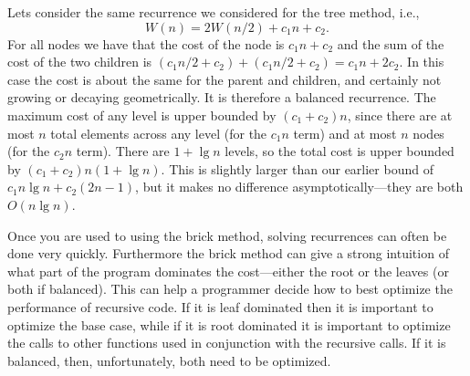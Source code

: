 \begin{cluster}
\label{grp:xmpl:analysis::recurrences::balanced}

\begin{example}[Balanced]
\label{xmpl:analysis::recurrences::balanced}
Lets consider the same recurrence we considered for the tree method, i.e.,
\[W(n) = 2 W(n/2) + c_1 n + c_2.\]
For all nodes we have that the cost of the node is $c_1 n + c_2$ and
the sum of the cost of the two children is $(c_1 n/2 + c_2) + (c_1 n/2
+ c_2) = c_1 n + 2 c_2$.    In this case
the cost is about the same for the parent and children, and certainly not growing or decaying
geometrically.   It is therefore a balanced recurrence.    The maximum
cost of any level is upper bounded by $(c_1 + c_2) n$, since there are
at most $n$ total elements across any level (for the $c_1 n$ term) and
at most $n$ nodes (for the $c_2 n$ term).
There are $1 + \lg n$ levels, so the total cost is upper bounded
by $(c_1 + c_2) n (1 + \lg n)$.   This is slightly larger than our
earlier bound of $c_1  n \lg n + c_2 (2n - 1)$, but it makes no
difference asymptotically---they are both $O(n \lg n)$.

\end{example}
\end{cluster}

\begin{cluster}
\label{grp:rmrk:analysis::recurrences::used}

\begin{remark}
\label{rmrk:analysis::recurrences::used}
  Once you are used to using the brick method, solving recurrences can 
  often be done very quickly.   Furthermore the brick method can give a 
  strong intuition of what part of the program dominates the
  cost---either the root or the leaves (or both if balanced).    This
  can help a programmer decide how to best optimize the performance of
  recursive code.    If it is leaf
  dominated then it is important to optimize the base case, while if
  it is root dominated it is important to optimize the calls to other
  functions used in conjunction with the recursive calls.   If it is
  balanced, then, unfortunately, both need to be optimized.

\end{remark}
\end{cluster}

